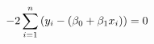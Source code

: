 \documentclass[preview]{standalone}
\begin{document}
\begin{align*}
\special{dvisvgm:raw <g id='unique000'>}-2 \special{dvisvgm:raw </g>}\special{dvisvgm:raw <g id='unique001'>}\sum_{i=1}^n{(y_i-(\beta_0+\beta_1 x_i))}=0\special{dvisvgm:raw </g>}
\end{align*}
\end{document}
